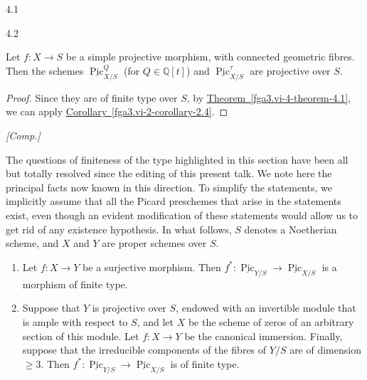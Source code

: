 \begin{theorem}{4.1}
\begin{enumerate}
  \end{enumerate}\end{theorem}\begin{corollary}{4.2}\label{fga3.vi-4-corollary-4.2}\skipsinglepar\par{}Let \(f\colon  X\to  S\) be a simple projective morphism, with connected geometric fibres.
    Then the schemes \(\underline {\operatorname {Pic}}_{X/S}^Q\) (for \(Q\in \mathbb {Q}[t]\)) and \(\underline {\operatorname {Pic}}_{X/S}^\tau \) are projective over \(S\).\begin{proof}\par{}Since they are of finite type over \(S\), by \hyperref[fga3.vi-4-theorem-4.1]{Theorem~\ref*{fga3.vi-4-theorem-4.1}}, we can apply \hyperref[fga3.vi-2-corollary-2.4]{Corollary~\ref*{fga3.vi-2-corollary-2.4}}.\end{proof}\end{corollary}\begin{remark}{}\label{fga3.vi-4-remark-comp}\skipsinglepar\par{}\emph{[Comp.]}
    
    The questions of finiteness of the type highlighted in this section have been all but totally resolved since the editing of this present talk.
    We note here the principal facts now known in this direction.
    To simplify the statements, we implicitly assume that all the Picard preschemes that arise in the statements exist, even though an evident modification of these statements would allow us to get rid of any existence hypothesis.
    In what follows, \(S\) denotes a Noetherian scheme, and \(X\) and \(Y\) are proper schemes over \(S\).

    
 \begin{enumerate}
      
 \item[i.]
        Let \(f\colon  X\to  Y\) be a surjective morphism.
        Then \(f^*\colon \underline {\operatorname {Pic}}_{Y/S}\to \underline {\operatorname {Pic}}_{X/S}\) is a morphism of finite type.
      


      
 \item[ii.]
        
        Suppose that \(Y\) is projective over \(S\), endowed with an invertible module that is ample with respect to \(S\), and let \(X\) be the scheme of zeros of an arbitrary section of this module.
        Let \(f\colon  X\to  Y\) be the canonical immersion.
        Finally, suppose that the irreducible components of the fibres of \(Y/S\) are of dimension \(\geqslant 3\).
        Then \(f^*\colon \underline {\operatorname {Pic}}_{Y/S}\to \underline {\operatorname {Pic}}_{X/S}\) is of finite type.
      



\end{enumerate}
\end{remark}
